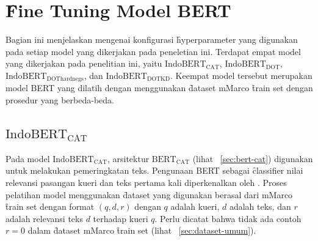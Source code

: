 \section{\f{Fine Tuning} Model BERT}
\label{sec:finetuning}

Bagian ini menjelaskan mengenai konfigurasi \f{hyperparameter} yang digunakan pada setiap model yang dikerjakan pada peneletian ini. Terdapat empat model yang dikerjakan pada penelitian ini, yaitu $\text{IndoBERT}_{\text{CAT}}$, $\text{IndoBERT}_{\text{DOT}}$, $\text{IndoBERT}_{\text{DOThardnegs}}$, dan $\text{IndoBERT}_{\text{DOTKD}}$. Keempat model tersebut merupakan model BERT yang dilatih dengan menggunakan \f{dataset} mMarco \f{train set} dengan prosedur yang berbeda-beda.

\subsection{$\text{IndoBERT}_{\text{CAT}}$}

Pada model $\text{IndoBERT}_{\text{CAT}}$, arsitektur $\text{BERT}_\text{CAT}$ (lihat \sect~\ref{sec:bert-cat}) digunakan untuk melakukan pemeringkatan teks. Pengunaan BERT sebagai \f{classifier} nilai relevansi pasangan kueri dan teks pertama kali diperkenalkan oleh \cite{firstRerankingBert}. Proses pelatihan model menggunakan \f{dataset} yang digunakan berasal dari mMarco \f{train set} dengan format $(q, d, r)$ dengan $q$ adalah kueri, $d$ adalah teks, dan $r$ adalah relevansi teks $d$ terhadap kueri $q$. Perlu dicatat bahwa tidak ada contoh $r=0$ dalam \f{dataset} mMarco \f{train set} (lihat \sect~\ref{sec:dataset-umum}).

